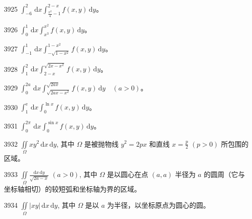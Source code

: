 \begin{prob}[S]{3925}
$\int_{-6}^{2}\,\mathrm{d}x \int_{\frac{x^2}{4} - 1}^{2 - x} f(x, y)\,\mathrm{d}y$。
\end{prob}

\begin{prob}[S]{3926}
$\int_{0}^{1}\,\mathrm{d}x \int_{x^3}^{x^2} f(x, y)\,\mathrm{d}y$。
\end{prob}

\begin{prob}[S]{3927}
$\int_{-1}^{1}\,\mathrm{d}x \int_{-\sqrt{1 - x^2}}^{1 - x^2} f(x, y)\,\mathrm{d}y$。
\end{prob}

\begin{prob}[S]{3928}
$\int_{1}^{2}\,\mathrm{d}x \int_{2 - x}^{\sqrt{2x - x^2}} f(x, y)\,\mathrm{d}y$。
\end{prob}

\begin{prob}[S]{3929}
$\int_{0}^{2a}\,\mathrm{d}x \int_{\sqrt{2ax - x^2}}^{\sqrt{2ax}} f(x, y)\,\mathrm{d}y \quad (a > 0)$。
\end{prob}

\begin{prob}[S]{3930}
$\int_{1}^{\mathrm{e}}\,\mathrm{d}x \int_{0}^{\ln x} f(x, y)\,\mathrm{d}y$。
\end{prob}

\begin{prob}[S]{3931}
$\int_{0}^{2\pi}\,\mathrm{d}x \int_{0}^{\sin x} f(x, y)\,\mathrm{d}y$。
\end{prob}


\begin{prob}[M]{3932}
$\iint\limits_{\Omega} xy^2\,\mathrm{d}x\,\mathrm{d}y$, 其中 $\Omega$ 是被抛物线 $y^2 = 2px$ 和直线 $x = \frac{p}{2}$ $(p > 0)$ 所包围的区域。
\end{prob}

\begin{prob}[M]{3933}
$\iint\limits_{\Omega} \frac{\mathrm{d}x\,\mathrm{d}y}{\sqrt{2a - x}}$ $(a > 0)$, 其中 $\Omega$ 是以圆心在点 $(a, a)$ 半径为 $a$ 的圆周（它与坐标轴相切）的较短弧和坐标轴为界的区域。
\end{prob}

\begin{prob}[M]{3934}
$\iint\limits_{\Omega} |xy|\,\mathrm{d}x\,\mathrm{d}y$, 其中 $\Omega$ 是以 $a$ 为半径，以坐标原点为圆心的圆。
\end{prob}

